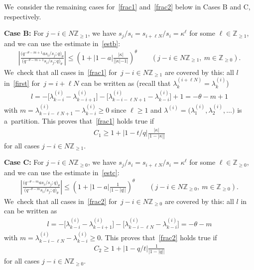 \documentclass[11pt]{article}
\numberwithin{equation}{section}
\newcommand{\Z}{{\mathbb Z}}
\begin{document}
We~consider the remaining cases for~\eqref{frac1} and~\eqref{frac2} below in Cases B and C, respectively.

{\bf Case B:} For $j-i\in N\Z_{\geq 1}$, we have $s_j/s_i = s_{i+\ell N}/s_i=\kappa^\ell$ for some $\ell\in\Z_{\geq 1}$, and we can use the estimate in~\eqref{estb}:
\begin{gather*}
\left|\frac{\big(q^{-\theta-m+1}as_i/s_j;q\big)_\theta}{\big(q^{-\theta-m+1} s_i/s_j;q\big)_\theta}\right|\leq \left(1+|1-a|\frac{|\kappa|}{||\kappa|-1|} \right)^\theta\qquad
(j-i\in N\Z_{\geq 1},\ m\in\Z_{\geq 0}).
\end{gather*}
We~check that all cases in~\eqref{frac1} for~$j-i\in N\Z_{\geq 1}$ are covered by this: all $l$ in~\eqref{first} for~$j=i+\ell N$ can be written as (recall that $\lambda^{(i+\ell N)}_k=\lambda^{(i)}_k$)
\begin{gather*}
l = -\big[\lambda^{(i)}_{k-i}- \lambda^{(i)}_{k-i+1}\big] - \big[\lambda^{(i)}_{k-i-\ell N+1}-\lambda^{(i)}_{k-i}\big]+1 = -\theta-m+1
\end{gather*}
with $m=\lambda^{(i)}_{k-i-\ell N+1}-\lambda^{(i)}_{k-i}\geq 0$ since $\ell\geq 1$ and $\lambda^{(i)}=\big(\lambda_1^{(i)},\lambda_2^{(i)},\dots\big)$ is a~partition.
This proves that~\eqref{frac1} holds true if
\begin{gather}
\label{C1C2B}
C_1\geq 1+|1-t/q|\frac{|\kappa|}{|1-|\kappa||}
\end{gather}
for all cases $j-i\in N\Z_{\geq 1}$.

{\bf Case C:} For $j-i\in N\Z_{\geq 0}$, we have $s_j/s_i = s_{i+\ell N}/s_i=\kappa^\ell$ for some $\ell\in\Z_{\geq 0}$, and we can use the estimate in~\eqref{estc}:
\begin{gather*}
\left|\frac{\big(q^{-\theta-m}as_i/s_j;q\big)_\theta}{\big(q^{-\theta-m} s_i/s_j;q\big)_\theta}\right|\leq \left(1+|1-a|\frac{1}{|1-|q||} \right)^\theta\qquad
(j-i\in N\Z_{\geq 0},\ m\in\Z_{\geq 0}).
\end{gather*}
We~check that all cases in~\eqref{frac2} for~$j-i\in N\Z_{\geq 0}$ are covered by this: all $l$ in can be written as
\begin{gather*}
l=-\big[\lambda^{(i)}_{k-i}-\lambda^{(i)}_{k-i+1}\big]-\big[\lambda^{(i)}_{k-i-\ell N}-\lambda^{(i)}_{k-i}\big] = -\theta-m
\end{gather*}
with $m=\lambda^{(i)}_{k-i-\ell N}-\lambda^{(i)}_{k-i}\geq 0$.
This proves that~\eqref{frac2} holds true if
\begin{gather}\label{C1C2C}
C_2\geq 1+|1-q/t|\frac{1}{|1-|q||}
\end{gather}
for all cases $j-i\in N\Z_{\geq 0}$.
\end{document}
